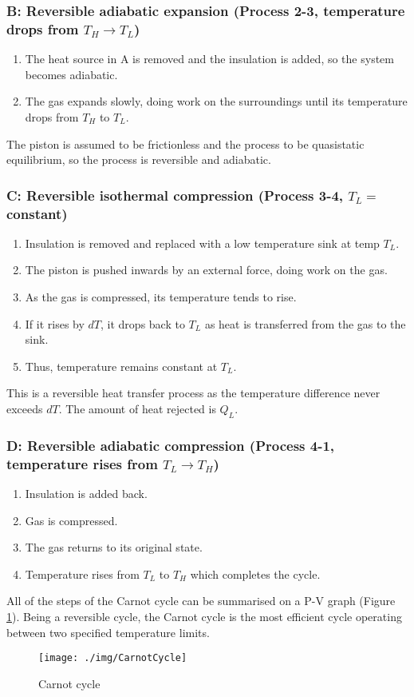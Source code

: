 \subsubsection{B: Reversible adiabatic expansion (Process 2-3, temperature drops from $T_H \rightarrow T_L$)}
\begin{enumerate}[noitemsep]
  \item The heat source in A is removed and the insulation is added, so the system becomes adiabatic.
  \item The gas expands slowly, doing work on the surroundings until its temperature drops from $T_H$ to $T_L$.
\end{enumerate}
The piston is assumed to be frictionless and the process to be quasistatic equilibrium, so the process is reversible and adiabatic.
\subsubsection{C: Reversible isothermal compression (Process 3-4, $T_L =$ constant)}
\begin{enumerate}[noitemsep]
  \item Insulation is removed and replaced with a low temperature sink at temp $T_L$.
  \item The piston is pushed inwards by an external force, doing work on the gas.
  \item As the gas is compressed, its temperature tends to rise.
  \item If it rises by $dT$, it drops back to $T_L$ as heat is transferred from the gas to the sink.
  \item Thus, temperature remains constant at $T_L$.
\end{enumerate}
This is a reversible heat transfer process as the temperature difference never exceeds $dT$. The amount of heat rejected is $Q_L$.
\subsubsection{D: Reversible adiabatic compression (Process 4-1, temperature rises from $T_L \rightarrow T_H$)}
\begin{enumerate}[noitemsep]
  \item Insulation is added back.
  \item Gas is compressed.
  \item The gas returns to its original state.
  \item Temperature rises from $T_L$ to $T_H$ which completes the cycle.
\end{enumerate}
All of the steps of the Carnot cycle can be summarised on a P-V graph (Figure \ref{carnotcycle}). Being a reversible cycle, the Carnot cycle is the most efficient cycle operating between two specified temperature limits.
\begin{figure}[H]
  \centering
  \texttt{[image: ./img/CarnotCycle]}
  \caption{Carnot cycle}
  \label{carnotcycle}
\end{figure}
